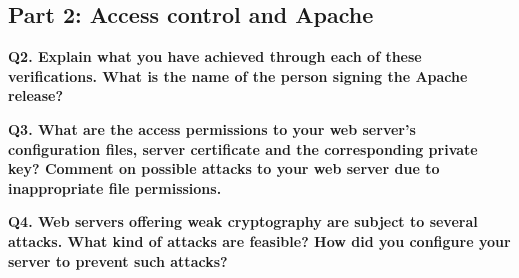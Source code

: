 \subsection {Part 2: Access control and Apache}


\noindent
{\bf Q2. Explain what you have achieved through each of these verifications.
What is the name of the person signing the Apache release?}
\newline

\noindent
{\bf Q3. What are the access permissions to your web server’s configuration files,
server certificate and the corresponding private key? Comment on possible
attacks to your web server due to inappropriate file permissions.}
\newline


\noindent
{\bf Q4. Web servers offering weak cryptography are subject to several attacks.
What kind of attacks are feasible? How did you configure your server to prevent such attacks?}

